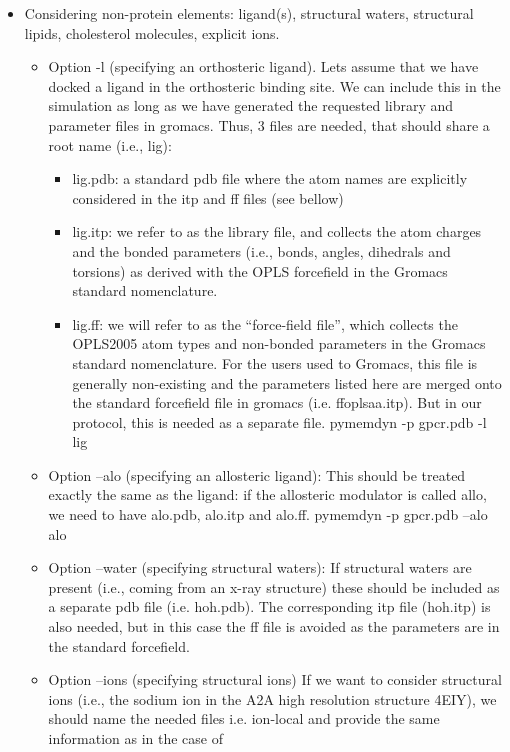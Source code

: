 \documentclass[10pt, oneside, pdftex]{article}
\begin{document}
\begin{itemize}
\item{Considering  non-protein  elements:  ligand(s),  structural  waters,
  structural lipids, cholesterol molecules, explicit ions.}
\begin{itemize}
\item{Option  -l (specifying an  orthosteric ligand). Lets assume  that we
have docked a  ligand in the orthosteric binding  site. We can include
this  in the simulation  as long  as we  have generated  the requested
library and parameter files in gromacs. Thus, 3 files are needed, that
should share a root name (i.e., lig):}
\begin{itemize}
\item{lig.pdb:  a standard  pdb file  where  the atom  names are  explicitly
considered in the  itp and ff files (see bellow)}
\item{lig.itp: we refer to
as  the library file,  and collects  the atom  charges and  the bonded
parameters (i.e.,  bonds, angles,  dihedrals and torsions)  as derived
with  the  OPLS  forcefield  in  the  Gromacs  standard  nomenclature.}
\item{lig.ff:  we will  refer to  as the  ``force-field file'',  which
  collects the  OPLS2005 atom types  and non-bonded parameters  in the
  Gromacs standard nomenclature.  For the users used  to Gromacs, this
  file is  generally non-existing and  the parameters listed  here are
  merged   onto    the   standard    forcefield   file    in   gromacs
  (i.e.  ffoplsaa.itp). But  in  our  protocol, this  is  needed as  a
  separate file.}  pymemdyn -p gpcr.pdb -l lig
\end{itemize}
\item{Option --alo  (specifying an allosteric ligand):  This should be
  treated exactly the same as  the ligand: if the allosteric modulator
  is  called allo,  we  need  to have  alo.pdb,  alo.itp and  alo.ff.}
  pymemdyn -p gpcr.pdb --alo alo 
\item{Option --water (specifying structural
  waters):  If structural  waters are  present (i.e.,  coming  from an
  x-ray structure)  these should  be included as  a separate  pdb file
  (i.e. hoh.pdb). The corresponding itp file (hoh.itp) is also needed,
  but in this case the ff file is avoided as the parameters are in the
  standard forcefield.}   
\item{Option --ions  (specifying structural ions)
  If we want to consider structural  ions (i.e., the sodium ion in the
  A2A high resolution structure 4EIY), we should name the needed files
  i.e. ion-local  and provide the same  information as in  the case of
}
\end{itemize}
\end{itemize}
\end{document}
